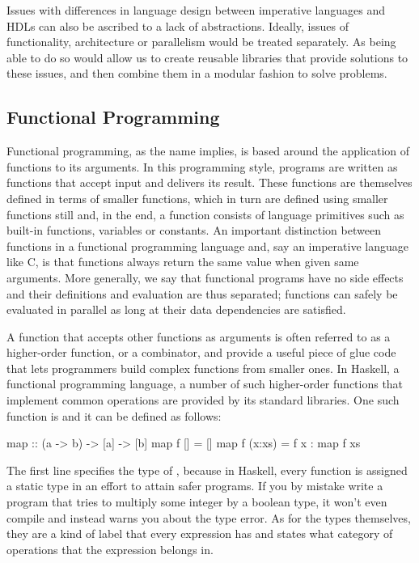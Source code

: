 Issues with differences in language design between imperative languages and HDLs can also be ascribed to a lack of abstractions. Ideally, issues of functionality, architecture or parallelism would be treated separately. As being able to do so would allow us to create reusable libraries that provide solutions to these issues, and then combine them in a modular fashion to solve problems.

\subsection{Functional Programming}
\label{functional}

Functional programming, as the name implies, is based around the application of functions to its arguments. In this programming style, programs are written as functions that accept input and delivers its result. These functions are themselves defined in terms of smaller functions, which in turn are defined using smaller functions still and, in the end, a function consists of language primitives such as built-in functions, variables or constants. An important distinction between functions in a functional programming language and, say an imperative language like C, is that functions always return the same value when given same arguments. More generally, we say that functional programs have no side effects and their definitions and evaluation are thus separated; functions can safely be evaluated in parallel as long at their data dependencies are satisfied.

A function that accepts other functions as arguments is often referred to as a higher-order function, or a combinator, and provide a useful piece of glue code that lets programmers build complex functions from smaller ones. In Haskell, a functional programming language, a number of such higher-order functions that implement common operations are provided by its standard libraries. One such function is  and it can be defined as follows:

\begin{code}
map :: (a -> b) -> [a] -> [b]
map f []     = []
map f (x:xs) = f x : map f xs
\end{code}

The first line specifies the type of , because in Haskell, every function is assigned a static type in an effort to attain safer programs. If you by mistake write a program that tries to multiply some integer by a boolean type, it won't even compile and instead warns you about the type error. As for the types themselves, they are a kind of label that every expression has and states what category of operations that the expression belongs in.

